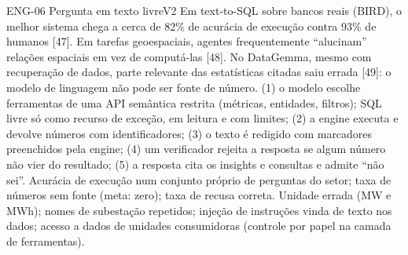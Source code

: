 \begin{ficha}{ENG-06 \textperiodcentered{} Pergunta em texto livre}{V2}
 Em text-to-SQL sobre bancos reais (BIRD), o melhor
sistema chega a cerca de 82\% de acurácia de execução contra 93\% de humanos
[47]. Em tarefas geoespaciais, agentes frequentemente ``alucinam'' relações
espaciais em vez de computá-las [48]. No DataGemma, mesmo com recuperação de
dados, parte relevante das estatísticas citadas saiu errada [49]: o modelo de
linguagem não pode ser fonte de número.
 (1) o modelo escolhe ferramentas de uma API
semântica restrita (métricas, entidades, filtros); SQL livre só como recurso
de exceção, em leitura e com limites; (2) a engine executa e devolve números
com identificadores; (3) o texto é redigido com marcadores preenchidos pela
engine; (4) um verificador rejeita a resposta se algum número não vier do
resultado; (5) a resposta cita os insights e consultas e admite ``não sei''.
 Acurácia de execução num conjunto próprio de perguntas do
setor; taxa de números sem fonte (meta: zero); taxa de recusa correta.
 Unidade errada (MW e MWh); nomes de subestação repetidos;
injeção de instruções vinda de texto nos dados; acesso a dados de unidades
consumidoras (controle por papel na camada de ferramentas).
\end{ficha}

